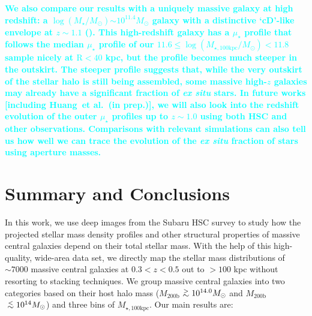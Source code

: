 \documentclass[fleqn,usenatbib]{mnras}
\def\simlt{\lower.5ex\hbox{$\; \buildrel < \over {\sim} \;$}}
\def\simgt{\lower.5ex\hbox{$\; \buildrel > \over {\sim} \;$}}
\def\etal{{\ et al.~}}
\def\mhalo{{$M_{\mathrm{200b}}$}}
\def\logms{{$\log (M_{\star}/M_{\odot})$}}
\def\mtot{{$M_{\star,100\mathrm{kpc}}$}}
\def\logmtot{{$\log (M_{\star,100\mathrm{kpc}}/M_{\odot})$}}
\def\mden{{$\mu_{\star}$}}
\newcommand{\song}[1]{\textcolor{cyan}{\textbf{#1}}}
\begin{document}
    \song{
    We also compare our results with a uniquely massive galaxy at high redshift: 
    a \logms{}${\sim} 10^{11.4} M_{\odot}$ galaxy with a distinctive `cD'-like 
    envelope at $z{\sim} 1.1$ (\citealt{Liu2013}).  
    This high-redshift galaxy has a \mden{} profile that follows the median \mden{} 
    profile of our $11.6\leq$\logmtot{}$<11.8$ sample nicely at $\mathrm{R} < 40$ 
    kpc, but the profile becomes much steeper in the outskirt.
    The steeper profile suggests that, while the very outskirt of the stellar halo 
    is still being assembled, some massive high-$z$ galaxies may already have a
    significant fraction of \textit{ex situ} stars. 
    In future works [including Huang\etal (in prep.)], we will also look into the 
    redshift evolution of the outer \mden{} profiles up to $z\sim 1.0$ using both HSC 
    and other observations. 
    Comparisons with relevant simulations  can also tell us how well we can trace
    the evolution of the \textit{ex situ} fraction of stars using aperture masses.
    }

\section{Summary and Conclusions}
    \label{sec:summary}
    
    In this work, we use deep images from the Subaru HSC survey to study how the 
    projected stellar mass density profiles and other structural properties of 
    massive central galaxies depend on their total stellar mass. 
    With the help of this high-quality, wide-area data set, we directly map the 
    stellar mass distributions of ${\sim}7000$ massive central galaxies at 
    $0.3 < z < 0.5$ out to $>100$ kpc without resorting to stacking techniques. 
    We group massive central galaxies into two categories based on their host halo 
    mass (\mhalo{}$\simgt 10^{14.0} M_{\odot}$ and \mhalo{}$\simlt 10^{14} M_{\odot}$)
    and three bins of \mtot{}.  
    Our main results are:
    
\end{document}
